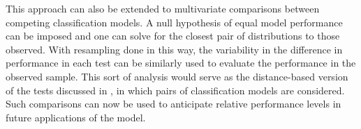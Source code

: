 

This approach can also be extended to multivariate comparisons between competing classification models.
A null hypothesis of equal model performance can be imposed and one can
solve for the closest pair of distributions to those observed.
With resampling done in this way, the variability in the difference in performance in each test can be similarly used to evaluate the performance in the observed sample.
%
This sort of analysis would serve as the distance-based version of the tests discussed in \citet{hanleymcneil1983}, in which pairs of classification models are considered.
Such comparisons can now be used to anticipate relative performance levels in future applications of the model.












